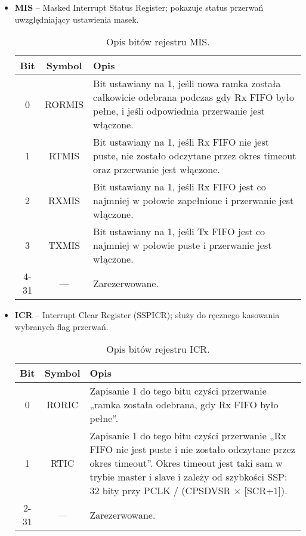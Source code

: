 \begin{itemize}
  
  \item \textbf{MIS} – Masked Interrupt Status Register; pokazuje status przerwań uwzględniający ustawienia masek.

\begin{table}[H]
\centering
\caption{Opis bitów rejestru MIS.}
\vspace{0.5em}
\renewcommand{\arraystretch}{1.2}
\begin{tabular}{|c|c|p{9.5cm}|}
\hline
\textbf{Bit} & \textbf{Symbol} & \textbf{Opis} \\
\hline
0 & RORMIS & Bit ustawiany na 1, jeśli nowa ramka została całkowicie odebrana podczas gdy Rx FIFO było pełne, i jeśli odpowiednia przerwanie jest włączone. \\
\hline
1 & RTMIS & Bit ustawiany na 1, jeśli Rx FIFO nie jest puste, nie zostało odczytane przez okres timeout oraz przerwanie jest włączone. \\
\hline
2 & RXMIS & Bit ustawiany na 1, jeśli Rx FIFO jest co najmniej w połowie zapełnione i przerwanie jest włączone. \\
\hline
3 & TXMIS & Bit ustawiany na 1, jeśli Tx FIFO jest co najmniej w połowie puste i przerwanie jest włączone. \\
\hline
4-31 & — & Zarezerwowane.\\
\hline
\end{tabular}
\end{table}

  
  \item \textbf{ICR} – Interrupt Clear Register (SSPICR); służy do ręcznego kasowania wybranych flag przerwań.

\begin{table}[H]
\centering
\caption{Opis bitów rejestru ICR.}
\vspace{0.5em}
\renewcommand{\arraystretch}{1.2}
\begin{tabular}{|c|c|p{10cm}|}
\hline
\textbf{Bit} & \textbf{Symbol} & \textbf{Opis} \\
\hline
0 & RORIC & Zapisanie 1 do tego bitu czyści przerwanie „ramka została odebrana, gdy Rx FIFO było pełne”. \\
\hline
1 & RTIC & Zapisanie 1 do tego bitu czyści przerwanie „Rx FIFO nie jest puste i nie zostało odczytane przez okres timeout”. Okres timeout jest taki sam w trybie master i slave i zależy od szybkości SSP: 32 bity przy PCLK / (CPSDVSR × [SCR+1]). \\
\hline
2-31 & — & Zarezerwowane.\\
\hline
\end{tabular}
\end{table}
  

\end{itemize}
